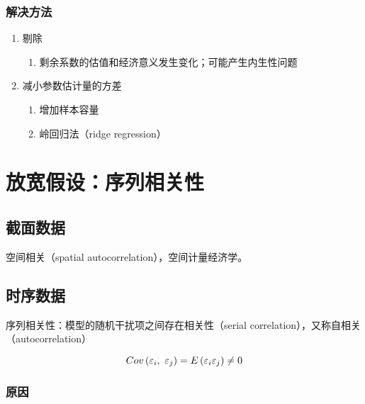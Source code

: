 \documentclass[12pt]{book}
\begin{document}
\subsubsection{解决方法}



\begin{enumerate}[1.]
    \item 剔除
          \begin{enumerate}[(1)]
              \item 剩余系数的估值和经济意义发生变化；可能产生内生性问题
          \end{enumerate}
    \item 减小参数估计量的方差
          \begin{enumerate}[(1)]
              \item 增加样本容量
              \item 岭回归法（ridge regression）
          \end{enumerate}
\end{enumerate}






\section{放宽假设：序列相关性}

\subsection{截面数据}
空间相关（spatial autocorrelation），空间计量经济学。




\subsection{时序数据}







序列相关性：模型的随机干扰项之间存在相关性（serial correlation），又称自相关（autocorrelation）

$$
Cov\left(\varepsilon_i,\ \varepsilon_j\right)=E\left(\varepsilon_i\varepsilon_j\right)\neq0\\
$$

\subsubsection{原因}
\end{document}
